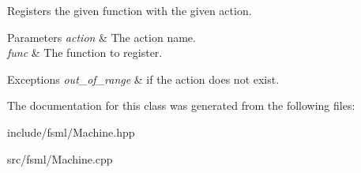 Registers the given function with the given action. 


\begin{DoxyParams}{Parameters}
{\em action} & The action name. \\
\hline
{\em func} & The function to register. \\
\hline
\end{DoxyParams}

\begin{DoxyExceptions}{Exceptions}
{\em out\-\_\-of\-\_\-range} & if the action does not exist. \\
\hline
\end{DoxyExceptions}


The documentation for this class was generated from the following files\-:\begin{DoxyCompactItemize}
\item 
include/fsml/Machine.\-hpp\item 
src/fsml/Machine.\-cpp\end{DoxyCompactItemize}
